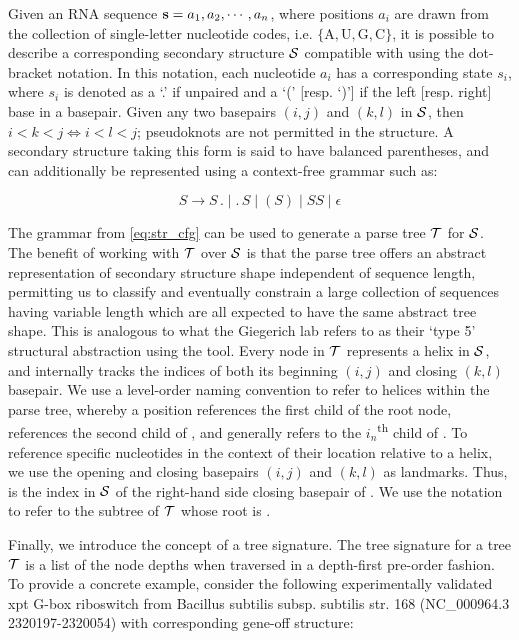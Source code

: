 Given an RNA sequence ${\bf s} = a_1, a_2, \cdots, a_n$, where positions $a_i$ are drawn from the collection of single-letter nucleotide codes, i.e. $\{\text{A},\text{U},\text{G},\text{C}\}$, it is possible to describe a corresponding secondary structure $\mathcal S$ compatible with \seq using the dot-bracket notation. In this notation, each nucleotide $a_i$ has a corresponding state $s_i$, where $s_i$ is denoted as a `.' if unpaired and a `(' [resp. `)'] if the left [resp. right] base in a basepair. Given any two basepairs $(i,j)$ and $(k,l)$ in $\mathcal S$, then $i < k < j \iff i < l < j$; pseudoknots are not permitted in the structure. A secondary structure taking this form is said to have balanced parentheses, and can additionally be represented using a context-free grammar such as:

\begin{equation} \label{eq:str_cfg}
S \rightarrow S\,.\;|\;.\,S\;|\;(S)\;|\;SS\;|\;\epsilon
\end{equation}

The grammar from \eqref{eq:str_cfg} can be used to generate a parse tree ${\mathcal T}$ for $\mathcal S$. The benefit of working with ${\mathcal T}$ over $\mathcal S$ is that the parse tree offers an abstract representation of secondary structure shape independent of sequence length, permitting us to classify and eventually constrain a large collection of sequences having variable length which are all expected to have the same abstract tree shape. This is analogous to what the Giegerich lab refers to as their `type 5' structural abstraction using the \rshapes tool. Every node in ${\mathcal T}$ represents a helix in $\mathcal S$, and internally tracks the indices of both its beginning $(i,j)$ and closing $(k,l)$ basepair. We use a level-order naming convention to refer to helices within the parse tree, whereby a position  references the first child of the root node,  references the second child of , and generally  refers to the $i_n$\textsuperscript{th} child of . To reference specific nucleotides in the context of their location relative to a helix, we use the opening and closing basepairs $(i,j)$ and $(k,l)$ as landmarks. Thus,  is the index in $\mathcal S$ of the right-hand side closing basepair of . We use the notation  to refer to the subtree of ${\mathcal T}$ whose root is .

Finally, we introduce the concept of a tree signature. The tree signature for a tree ${\mathcal T}$ is a list of the node depths when traversed in a depth-first pre-order fashion. To provide a concrete example, consider the following experimentally validated xpt G-box riboswitch from Bacillus subtilis subsp. subtilis str. 168 (NC\_000964.3 2320197-2320054) with corresponding gene-off structure:

